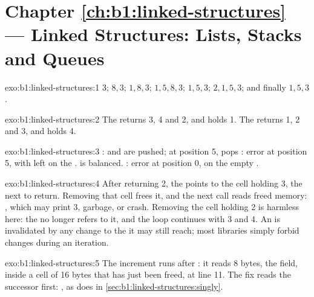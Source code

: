 \section*{Chapter \ref{ch:b1:linked-structures} --- Linked Structures: Lists, Stacks and Queues}

\begin{solution}{exo:b1:linked-structures:1}
$3$; $8, 3$; $1, 8, 3$; $1, 5, 8, 3$; $1, 5, 3$; $2, 1, 5, 3$; and finally $1, 5, 3$.
\end{solution}

\begin{solution}{exo:b1:linked-structures:2}
The  returns 3, 4 and 2, and holds 1. The  returns 1, 2 and 3, and holds 4.
\end{solution}

\begin{solution}{exo:b1:linked-structures:3}
: \code{(} and \code{[} are pushed; at position 5, \code{)} pops \code{[}: error at position 5, with \code{(}
left on the . \code{{}[]()} is balanced. \code{]}: error at position 0, on the empty .
\end{solution}

\begin{solution}{exo:b1:linked-structures:4}
After returning 2, the  points to the cell holding 3, the next to return. Removing that cell frees it, and the
next call reads freed memory: , which may print 3, garbage, or crash. Removing the cell holding 2 is
harmless here: the  no longer refers to it, and the loop continues with 3 and 4. An  is invalidated by
any change to the  it may still reach; most libraries simply forbid changes during an iteration.
\end{solution}

\begin{solution}{exo:b1:linked-structures:5}
The increment  runs after : it reads 8 bytes, the  field, inside a cell of
16 bytes that has just been freed, at line 11. The fix reads the successor first:
, as  does in \cref{sec:b1:linked-structures:singly}.
\end{solution}

